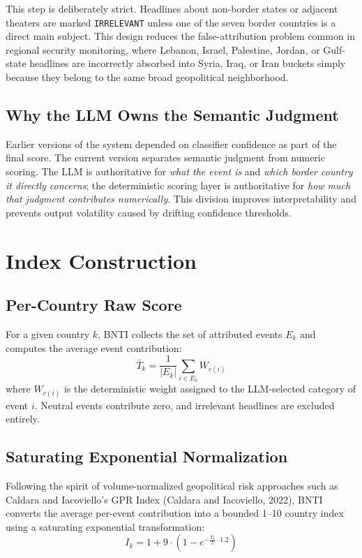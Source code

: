 \documentclass[11pt, a4paper]{article}
\begin{document}
This step is deliberately strict. Headlines about non-border states or adjacent theaters are marked \texttt{IRRELEVANT} unless one of the seven border countries is a direct main subject. This design reduces the false-attribution problem common in regional security monitoring, where Lebanon, Israel, Palestine, Jordan, or Gulf-state headlines are incorrectly absorbed into Syria, Iraq, or Iran buckets simply because they belong to the same broad geopolitical neighborhood.

\subsection{Why the LLM Owns the Semantic Judgment}
Earlier versions of the system depended on classifier confidence as part of the final score. The current version separates semantic judgment from numeric scoring. The LLM is authoritative for \emph{what the event is} and \emph{which border country it directly concerns}; the deterministic scoring layer is authoritative for \emph{how much that judgment contributes numerically}. This division improves interpretability and prevents output volatility caused by drifting confidence thresholds.

\section{Index Construction}

\subsection{Per-Country Raw Score}
For a given country $k$, BNTI collects the set of attributed events $E_k$ and computes the average event contribution:
\begin{equation}
    \bar{T}_k = \frac{1}{|E_k|} \sum_{i \in E_k} W_{c(i)}
\end{equation}
where $W_{c(i)}$ is the deterministic weight assigned to the LLM-selected category of event $i$. Neutral events contribute zero, and irrelevant headlines are excluded entirely.

\subsection{Saturating Exponential Normalization}
Following the spirit of volume-normalized geopolitical risk approaches such as Caldara and Iacoviello's GPR Index (Caldara and Iacoviello, 2022), BNTI converts the average per-event contribution into a bounded 1--10 country index using a saturating exponential transformation:
\begin{equation}
    I_k = 1 + 9 \cdot \left(1 - e^{-\frac{\bar{T}_k}{5} \cdot 1.2}\right)
\end{equation}
\end{document}

